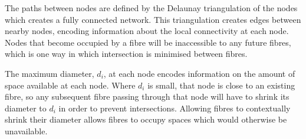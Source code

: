 The paths between nodes are defined by the Delaunay triangulation\cite{Delaunay1934} of the nodes which creates a fully connected network.
This triangulation creates edges between nearby nodes, encoding information about the local connectivity at each node.
Nodes that become occupied by a fibre will be inaccessible to any future fibres, which is one way in which intersection is minimised between fibres.  

The maximum diameter, $d_i$, at each node encodes information on the amount of space available at each node.
Where $d_i$ is small, that node is close to an existing fibre, so any subsequent fibre passing through that node will have to shrink its diameter to $d_i$ in order to prevent intersections.
Allowing fibres to contextually shrink their diameter allows fibres to occupy spaces which would otherwise be unavailable.

